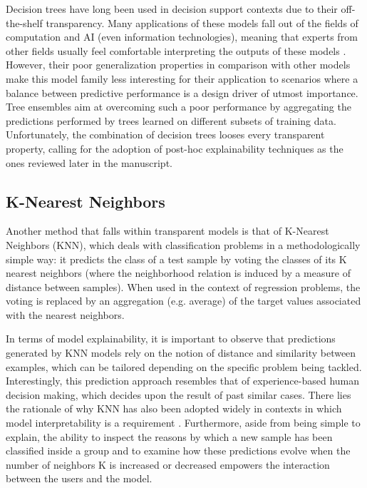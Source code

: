 \documentclass[final]{elsarticle}
\begin{document}
Decision trees have long been used in decision support contexts due to their off-the-shelf transparency. Many applications of these models fall out of the fields of computation and AI (even information technologies), meaning that experts from other fields usually feel comfortable interpreting the outputs of these models \cite{rokach2008data,rovnyak1994decision,nefeslioglu2010assessment}. However, their poor generalization properties in comparison with other models make this model family less interesting for their application to scenarios where a balance between predictive performance is a design driver of utmost importance. Tree ensembles aim at overcoming such a poor performance by aggregating the predictions performed by trees learned on different subsets of training data. Unfortunately, the combination of decision trees looses every transparent property, calling for the adoption of post-hoc explainability techniques as the ones reviewed later in the manuscript.

\subsection{K-Nearest Neighbors}

Another method that falls within transparent models is that of K-Nearest Neighbors (KNN), which deals with classification problems in a methodologically simple way: it predicts the class of a test sample by voting the classes of its K nearest neighbors (where the neighborhood relation is induced by a measure of distance between samples). When used in the context of regression problems, the voting is replaced by an aggregation (e.g. average) of the target values associated with the nearest neighbors. 

In terms of model explainability, it is important to observe that predictions generated by KNN models rely on the notion of distance and similarity between examples, which can be tailored depending on the specific problem being tackled. Interestingly, this prediction approach resembles that of experience-based human decision making, which decides upon the result of past similar cases. There lies the rationale of why KNN has also been adopted widely in contexts in which model interpretability is a requirement \cite{KNNimandoust2013application,KNNli2004application,KNNguo2004knn,KNNjiang2012improved}. Furthermore, aside from being simple to explain, the ability to inspect the reasons by which a new sample has been classified inside a group and to examine how these predictions evolve when the number of neighbors K is increased or decreased empowers the interaction between the users and the model.
\end{document}
